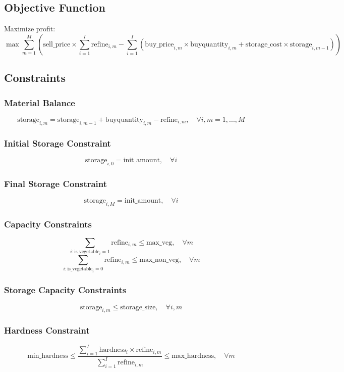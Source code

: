 \documentclass{article}
\begin{document}
\subsection*{Objective Function}
Maximize profit:
\[
\max \sum_{m=1}^{M} \left( \text{sell\_price} \times \sum_{i=1}^{I} \text{refine}_{i,m} - \sum_{i=1}^{I} \left(\text{buy\_price}_{i,m} \times \text{buyquantity}_{i,m} + \text{storage\_cost} \times \text{storage}_{i,m-1}\right) \right)
\]

\subsection*{Constraints}

\subsubsection*{Material Balance}
\[
\text{storage}_{i,m} = \text{storage}_{i,m-1} + \text{buyquantity}_{i,m} - \text{refine}_{i,m}, \quad \forall i, m = 1,...,M
\]

\subsubsection*{Initial Storage Constraint}
\[
\text{storage}_{i,0} = \text{init\_amount}, \quad \forall i
\]

\subsubsection*{Final Storage Constraint}
\[
\text{storage}_{i,M} = \text{init\_amount}, \quad \forall i
\]

\subsubsection*{Capacity Constraints}
\[
\sum_{i: \text{is\_vegetable}_i = 1} \text{refine}_{i,m} \leq \text{max\_veg}, \quad \forall m
\]
\[
\sum_{i: \text{is\_vegetable}_i = 0} \text{refine}_{i,m} \leq \text{max\_non\_veg}, \quad \forall m
\]

\subsubsection*{Storage Capacity Constraints}
\[
\text{storage}_{i,m} \leq \text{storage\_size}, \quad \forall i, m
\]

\subsubsection*{Hardness Constraint}
\[
\text{min\_hardness} \leq \frac{\sum_{i=1}^{I} \text{hardness}_i \times \text{refine}_{i,m}}{\sum_{i=1}^{I} \text{refine}_{i,m}} \leq \text{max\_hardness}, \quad \forall m
\]
\end{document}
